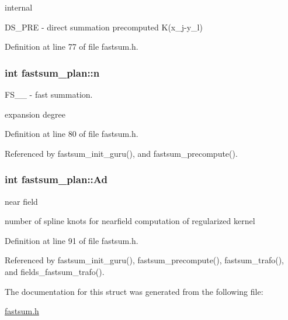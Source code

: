 internal 

DS\_\-PRE - direct summation precomputed K(x\_\-j-y\_\-l) 

Definition at line 77 of file fastsum.h.\hypertarget{structfastsum__plan_5615cf980018c32de59c9aba950bdfb2}{
\subsubsection{\setlength{\rightskip}{0pt plus 5cm}int {\bf fastsum\_\-plan::n}}}
\label{structfastsum__plan_5615cf980018c32de59c9aba950bdfb2}


FS\_\-\_\- - fast summation. 

expansion degree 

Definition at line 80 of file fastsum.h.

Referenced by fastsum\_\-init\_\-guru(), and fastsum\_\-precompute().\hypertarget{structfastsum__plan_d0217e28060b4f3992de52511b6b8a04}{
\subsubsection{\setlength{\rightskip}{0pt plus 5cm}int {\bf fastsum\_\-plan::Ad}}}
\label{structfastsum__plan_d0217e28060b4f3992de52511b6b8a04}


near field 

number of spline knots for nearfield computation of regularized kernel 

Definition at line 91 of file fastsum.h.

Referenced by fastsum\_\-init\_\-guru(), fastsum\_\-precompute(), fastsum\_\-trafo(), and fields\_\-fastsum\_\-trafo().

The documentation for this struct was generated from the following file:\begin{CompactItemize}
\item 
\hyperlink{fastsum_8h}{fastsum.h}\end{CompactItemize}
